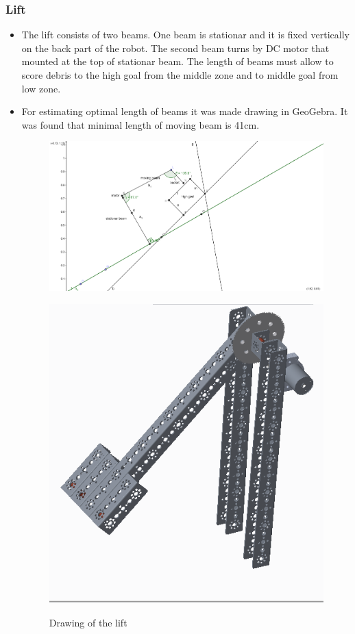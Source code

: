 
\subsubsection{Lift}
\begin{itemize}
\item The lift consists of two beams. One beam is stationar and it is fixed vertically on the back part of the robot. The second beam turns by DC motor that mounted at the top of stationar beam. The length of beams must allow to score debris to the high goal from the middle zone and to middle goal from low zone.

\item For estimating optimal length of beams it was made drawing in GeoGebra. It was found that minimal length of moving beam is 41cm.

\begin{figure}[H]
	\begin{minipage}[h]{0.6\linewidth}
		{\includegraphics[scale=0.7]{days_L/Lift+bucket/images/02}}
		\caption{Drawing of the lift}
	\end{minipage}
	\hfill
	\begin{minipage}[h]{0.6\linewidth}
		{\includegraphics[scale=0.7]{days_L/Lift+bucket/images/10}}

\end{minipage}
\end{figure}
\end{itemize}
